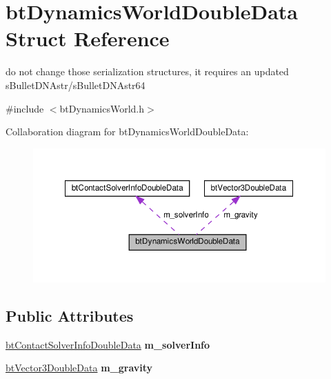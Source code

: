 \hypertarget{structbtDynamicsWorldDoubleData}{}\section{bt\+Dynamics\+World\+Double\+Data Struct Reference}
\label{structbtDynamicsWorldDoubleData}


do not change those serialization structures, it requires an updated s\+Bullet\+D\+N\+Astr/s\+Bullet\+D\+N\+Astr64  




{\ttfamily \#include $<$bt\+Dynamics\+World.\+h$>$}



Collaboration diagram for bt\+Dynamics\+World\+Double\+Data\+:
\nopagebreak
\begin{figure}[H]
\begin{center}
\leavevmode
\includegraphics[width=350pt]{structbtDynamicsWorldDoubleData__coll__graph}
\end{center}
\end{figure}
\subsection*{Public Attributes}
\begin{DoxyCompactItemize}
\item 
\mbox{\label{structbtDynamicsWorldDoubleData_a19f56cfeb1c80d382449e9ade28df5be}} 
\hyperlink{structbtContactSolverInfoDoubleData}{bt\+Contact\+Solver\+Info\+Double\+Data} {\bfseries m\+\_\+solver\+Info}
\item 
\mbox{\label{structbtDynamicsWorldDoubleData_af157dc55885785678726986d696a2f74}} 
\hyperlink{structbtVector3DoubleData}{bt\+Vector3\+Double\+Data} {\bfseries m\+\_\+gravity}
\end{DoxyCompactItemize}


